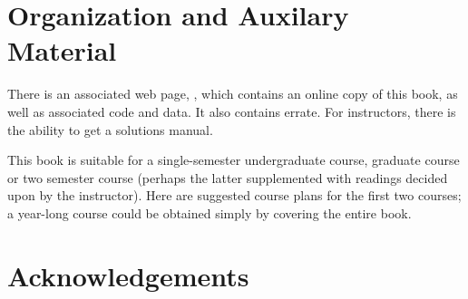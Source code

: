 \section{Organization and Auxilary Material}

There is an associated web page, \bookurl, which contains an online
copy of this book, as well as associated code and data.  It also
contains errate.  For instructors, there is the ability to get a
solutions manual.

This book is suitable for a single-semester undergraduate course,
graduate course or two semester course (perhaps the latter
supplemented with readings decided upon by the instructor).  Here are
suggested course plans for the first two courses; a year-long course
could be obtained simply by covering the entire book.



\section{Acknowledgements}


\begin{comment}

Why written:
- undergrads
- focus on ideas, not math
- pedagogy
- minimal dependencies
- gentle

For whom:
- people who know nothing about ml
- know differential calculus
- know discrete math
- can write simple programs
- could be taken by sophomores or juniors!
- or first year grads who want a gentle intro

Online stuff:
- book
- data
- code
- solutions
- wiki

Course plans:
- dependencies
- one semester undergrad
- one semester grad

Acknowledgements:
- teachers
- students
- editors
- umd for time off


\end{comment}
